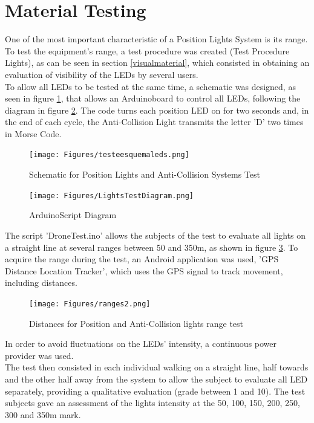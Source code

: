 \section{Material Testing}
\label{section:pmaterialtesting}
One of the most important characteristic of a Position Lights System is its range.\\
To test the equipment's range, a test procedure was created (Test Procedure Lights), as can be seen in section \ref{visualmaterial}, which consisted in obtaining an evaluation of visibility of the LEDs by several users. \\
To allow all LEDs to be tested at the same time, a schematic was designed, as seen in figure \ref{fig:testesquemaleds}, that allows an Arduino\texttrademark board to control all LEDs, following the diagram in figure \ref{fig:lightstestdiagram}. The code turns each position LED on for two seconds and, in the end of each cycle, the Anti-Collision Light transmits the letter 'D' two times in Morse Code. \\
\begin{figure}[!htb]
  \centering
  \texttt{[image: Figures/testeesquemaleds.png]}
  \caption[Schematic for Position Lights and Anti-Collision Systems Test]{Schematic for Position Lights and Anti-Collision Systems Test}
  \label{fig:testesquemaleds}
\end{figure}

\begin{figure}[!htb]
  \centering
  \texttt{[image: Figures/LightsTestDiagram.png]}
  \caption[Arduino\texttrademark Script Diagram]{Arduino\texttrademark Script Diagram}
  \label{fig:lightstestdiagram}
\end{figure}
The script 'DroneTest.ino' allows the subjects of the test to evaluate all lights on a straight line at several ranges between 50 and 350m, as shown in figure \ref{fig:ranges2}. To acquire the range during the test, an Android application was used, 'GPS Distance Location Tracker', which uses the GPS signal to track movement, including distances.\\
\begin{figure}[!htb]
  \centering
  \texttt{[image: Figures/ranges2.png]}
  \caption[Distances for Position and Anti-Collision lights range test]{Distances for Position and Anti-Collision lights range test}
  \label{fig:ranges2}
\end{figure}

In order to avoid fluctuations on the LEDs' intensity, a continuous power provider was used.\\
The test then consisted in each individual walking on a straight line, half towards and the other half away from the system to allow the subject to evaluate all LED separately, providing a qualitative evaluation (grade between 1 and 10). The test subjects gave an assessment of the lights intensity at the 50, 100, 150, 200, 250, 300 and 350m mark.\\

